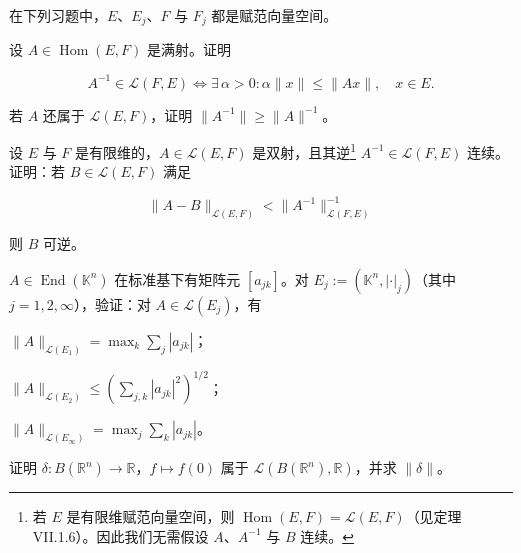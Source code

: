 \exerciseshead

在下列习题中，$ E $、$ E_j $、$ F $ 与 $ F_j $ 都是赋范向量空间。

\begin{exercises}
\item

设 $ A \in \operatorname{Hom}(E, F) $ 是满射。证明

\[
A^{-1} \in \mathcal{L}(F, E) \Longleftrightarrow \exists\, \alpha > 0 : \alpha \|x\| \le \|Ax\|, \quad x \in E.
\]

若 $ A $ 还属于 $ \mathcal{L}(E, F) $，证明 $ \|A^{-1}\| \ge \|A\|^{-1} $。

\item

设 $ E $ 与 $ F $ 是有限维的，$ A \in \mathcal{L}(E, F) $ 是双射，且其逆\footnote{若 $ E $ 是有限维赋范向量空间，则 $ \operatorname{Hom}(E, F) = \mathcal{L}(E, F) $（见定理 VII.1.6）。因此我们无需假设 $ A $、$ A^{-1} $ 与 $ B $ 连续。} $ A^{-1} \in \mathcal{L}(F, E) $ 连续。证明：若 $ B \in \mathcal{L}(E, F) $ 满足

\[
\|A - B\|_{\mathcal{L}(E, F)} < \|A^{-1}\|_{\mathcal{L}(F, E)}^{-1}
\]

则 $ B $ 可逆。

\item

$ A \in \operatorname{End}(\mathbb{K}^n) $ 在标准基下有矩阵元 $ [a_{jk}] $。对 $ E_j := (\mathbb{K}^n, |\cdot|_j) $（其中 $ j = 1, 2, \infty $），验证：对 $ A \in \mathcal{L}(E_j) $，有

\begin{subitems}
\item

$ \|A\|_{\mathcal{L}(E_1)} = \max_k \sum_j |a_{jk}| $；

\item

$ \|A\|_{\mathcal{L}(E_2)} \le \left( \sum_{j,k} |a_{jk}|^2 \right)^{1/2} $；

\item

$ \|A\|_{\mathcal{L}(E_\infty)} = \max_j \sum_k |a_{jk}| $。

\end{subitems}

\item

证明 $ \delta : B(\mathbb{R}^n) \to \mathbb{R} $，$ f \mapsto f(0) $ 属于 $ \mathcal{L}(B(\mathbb{R}^n), \mathbb{R}) $，并求 $ \|\delta\| $。


\end{exercises}
